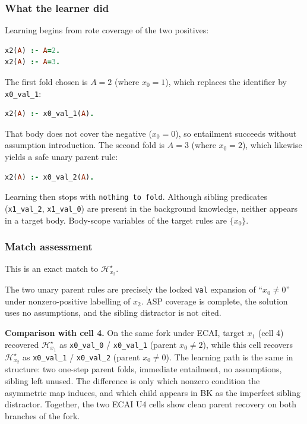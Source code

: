 \documentclass[11pt]{article}
\begin{document}
\subsubsection{What the learner did}

Learning begins from rote coverage of the two positives:

\begin{lstlisting}[style=logic,language=Prolog]
x2(A) :- A=2.
x2(A) :- A=3.
\end{lstlisting}

The first fold chosen is \(A=2\) (where \(x_0=1\)), which replaces the identifier by \texttt{x0\_val\_1}:

\begin{lstlisting}[style=logic,language=Prolog]
x2(A) :- x0_val_1(A).
\end{lstlisting}

That body does not cover the negative (\(x_0=0\)), so entailment succeeds without assumption introduction. The second fold is \(A=3\) (where \(x_0=2\)), which likewise yields a safe unary parent rule:

\begin{lstlisting}[style=logic,language=Prolog]
x2(A) :- x0_val_2(A).
\end{lstlisting}

Learning then stops with \texttt{nothing to fold}. Although sibling predicates (\texttt{x1\_val\_2}, \texttt{x1\_val\_0}) are present in the background knowledge, neither appears in a target body. Body-scope variables of the target rules are \(\{x_0\}\).

\subsubsection{Match assessment}

This is an exact match to \(\mathcal{H}_{x_2}^\star\).

The two unary parent rules are precisely the locked \texttt{val} expansion of ``\(x_0\neq 0\)'' under nonzero-positive labelling of \(x_2\). ASP coverage is complete, the solution uses no assumptions, and the sibling distractor is not cited.

\textbf{Comparison with cell 4.} On the same fork under ECAI, target \(x_1\) (cell 4) recovered \(\mathcal{H}_{x_1}^\star\) as \texttt{x0\_val\_0} / \texttt{x0\_val\_1} (parent \(x_0\neq 2\)), while this cell recovers \(\mathcal{H}_{x_2}^\star\) as \texttt{x0\_val\_1} / \texttt{x0\_val\_2} (parent \(x_0\neq 0\)). The learning path is the same in structure: two one-step parent folds, immediate entailment, no assumptions, sibling left unused. The difference is only which nonzero condition the asymmetric map induces, and which child appears in BK as the imperfect sibling distractor. Together, the two ECAI U4 cells show clean parent recovery on both branches of the fork.
\end{document}
